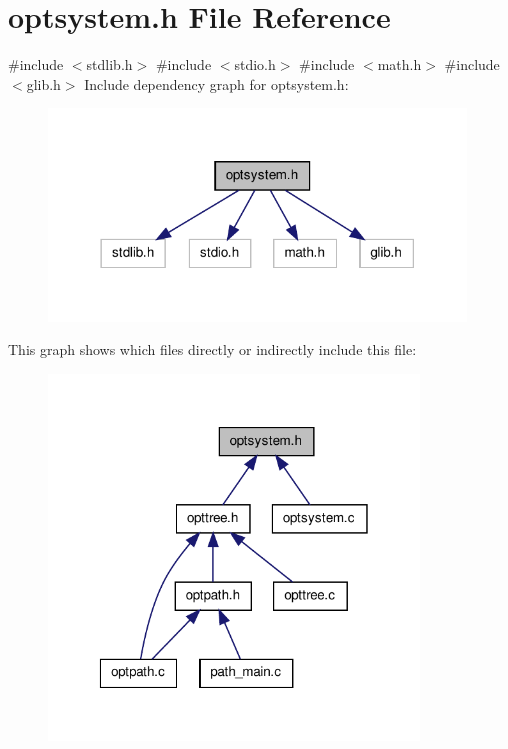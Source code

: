 \hypertarget{a00018}{\section{optsystem.\-h \-File \-Reference}
\label{d1/d2b/a00018}
}
{\ttfamily \#include $<$stdlib.\-h$>$}\*
{\ttfamily \#include $<$stdio.\-h$>$}\*
{\ttfamily \#include $<$math.\-h$>$}\*
{\ttfamily \#include $<$glib.\-h$>$}\*
\-Include dependency graph for optsystem.\-h\-:\nopagebreak
\begin{figure}[H]
\begin{center}
\leavevmode
\includegraphics[width=314pt]{d5/d16/a00029}
\end{center}
\end{figure}
\-This graph shows which files directly or indirectly include this file\-:\nopagebreak
\begin{figure}[H]
\begin{center}
\leavevmode
\includegraphics[width=279pt]{d5/d79/a00030}
\end{center}
\end{figure}
